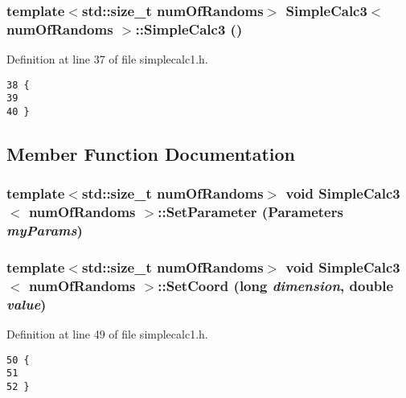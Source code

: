 \subsubsection{\setlength{\rightskip}{0pt plus 5cm}template$<$std::size\_\-t numOfRandoms$>$ {\bf SimpleCalc3}$<$ numOfRandoms $>$::{\bf SimpleCalc3} ()\hspace{0.3cm}{\tt  [inline]}}\label{classSimpleCalc3_8df774903b7e610d93f05e7600c1a6ab}




Definition at line 37 of file simplecalc1.h.

\begin{Code}\begin{verbatim}38 {
39 
40 }
\end{verbatim}
\end{Code}




\subsection{Member Function Documentation}
\subsubsection{\setlength{\rightskip}{0pt plus 5cm}template$<$std::size\_\-t numOfRandoms$>$ void {\bf SimpleCalc3}$<$ numOfRandoms $>$::SetParameter ({\bf Parameters} {\em myParams})}\label{classSimpleCalc3_b9681ce02d9b6cd391a77d3c396c665e}


\subsubsection{\setlength{\rightskip}{0pt plus 5cm}template$<$std::size\_\-t numOfRandoms$>$ void {\bf SimpleCalc3}$<$ numOfRandoms $>$::SetCoord (long {\em dimension}, double {\em value})\hspace{0.3cm}{\tt  [inline]}}\label{classSimpleCalc3_7f612fa190cc836d859e5e8a408dafd1}




Definition at line 49 of file simplecalc1.h.

\begin{Code}\begin{verbatim}50 {
51   
52 }
\end{verbatim}
\end{Code}


